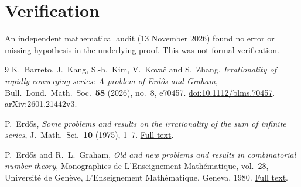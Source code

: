 \documentclass[11pt]{article}
\numberwithin{equation}{section}
\begin{document}
\section*{Verification}

An independent mathematical audit (13 November 2026) found no error or
missing hypothesis in the underlying proof. This was not formal verification.

\begin{thebibliography}{9}
K.~Barreto, J.~Kang, S.-h.~Kim, V.~Kova\v{c} and S.~Zhang,
\emph{Irrationality of rapidly converging series: A problem of
Erd\H{o}s and Graham},
Bull.\ Lond.\ Math.\ Soc.\ \textbf{58} (2026), no.~8, e70457.
\href{https://doi.org/10.1112/blms.70457}{doi:10.1112/blms.70457}.
\href{https://arxiv.org/abs/2601.21442v3}{arXiv:2601.21442v3}.

P.~Erd\H{o}s,
\emph{Some problems and results on the irrationality of the sum of
infinite series},
J.\ Math.\ Sci.\ \textbf{10} (1975), 1--7.
\href{https://www.renyi.hu/~p_erdos/1976-44.pdf}{Full text}.

P.~Erd\H{o}s and R.~L.~Graham,
\emph{Old and new problems and results in combinatorial number theory},
Monographies de L'Enseignement Math\'ematique, vol.~28,
Universit\'e de Gen\`eve, L'Enseignement Math\'ematique, Geneva, 1980.
\href{https://mathweb.ucsd.edu/~ronspubs/80_11_number_theory.pdf}{Full text}.
\end{thebibliography}
\end{document}
